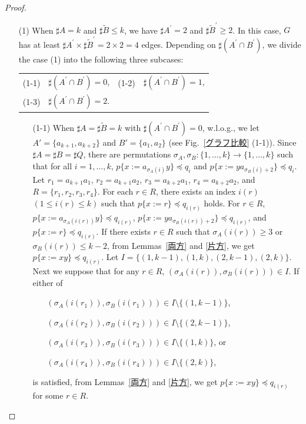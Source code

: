 \begin{proof}
\begin{enumerate}
\item[\textrm{(1)}] 
When $\sharp A=k$ and $\sharp \tilde{B} \le k$, we have $\sharp A^{\prime}=2$ and $\sharp \tilde{B}^{\prime} \ge 2$.
In this case, $G$ has at least $\sharp A^{\prime} \times \sharp \tilde{B}^{\prime}=2\times2=4$ edges.
Depending on $\sharp( A^{\prime} \cap B^{\prime} )$, we divide the case \textrm{(1)} into the following three subcases:
\smallskip

\begin{tabular}{llll}
\textrm{(1-1)} & $\sharp( A^{\prime} \cap B^{\prime} ) = 0$,&
\textrm{(1-2)} & $\sharp( A^{\prime} \cap B^{\prime} ) = 1$,\\
\textrm{(1-3)} & $\sharp( A^{\prime} \cap B^{\prime} ) = 2$.
\end{tabular}

\begin{enumerate}
\item[\textrm(1-1)]
When $\sharp A = \sharp \tilde{B} = k$ with $\sharp( A^{\prime} \cap B^{\prime} ) = 0$, w.l.o.g., we let $A'=\{a_{k+1},a_{k+2}\}$ and $B'=\{a_{1},a_{2}\}$ (see Fig.~\ref{グラフ比較} (1-1)).
Since $\sharp A = \sharp B = \sharp Q$, there are permutations $\sigma_{A},\sigma_{B} : \{1,\dots,k\} \rightarrow \{1,\dots,k\}$ such that for all $i = 1,\ldots,k$, $p \{ x:=a_{\sigma_{A}(i)}y \} \preceq q_{i}$ and $p \{ x:=ya_{\sigma_{B}(i) + 2} \} \preceq q_{i}$.
Let $r_{1}=a_{k+1}a_{1}$, $r_{2}=a_{k+1}a_{2}$, $r_{3}=a_{k+2}a_{1}$, $r_{4}=a_{k+2}a_{2}$, and $R=\{r_{1}, r_{2}, r_{3}, r_{4}\}$.
For each $r \in R$, there exists an index $i(r)$ $(1\le i(r)\le k)$ such that $p \{x := r\} \preceq q_{i(r)}$ holds.
For $r\in R$, $p \{ x:=a_{\sigma_{A}(i(r))}y \} \preceq q_{i(r)}$, $p \{ x:=ya_{\sigma_{B}(i(r))+2} \} \preceq q_{i(r)}$, and $p \{ x:=r \} \preceq q_{i(r)}$.
If there exists $r\in R$ such that $\sigma_{A}(i(r)) \ge 3$ or $\sigma_{B}(i(r)) \le k - 2$, from Lemmas~\ref{両方} and \ref{片方}, we get $p \{x := xy\} \preceq q_{i(r)}$.
%
Let $I = \{(1, k - 1), (1, k), (2, k - 1), (2, k)\}$.
Next we suppose that for any $r\in R$, $(\sigma_{A}(i(r)), \sigma_{B}(i(r))) \in I$.
If either of
\begin{enumerate}
\item[] $(\sigma_{A}(i(r_{1})), \sigma_{B}(i(r_{1}))) \in I\setminus\{(1, k - 1)\}$,
\item[] $(\sigma_{A}(i(r_{2})), \sigma_{B}(i(r_{2}))) \in I\setminus\{(2, k - 1)\}$,
\item[] $(\sigma_{A}(i(r_{3})), \sigma_{B}(i(r_{3}))) \in I\setminus\{(1, k)\}$, or
\item[] $(\sigma_{A}(i(r_{4})), \sigma_{B}(i(r_{4}))) \in I\setminus\{(2, k)\}$,
\end{enumerate}
is satisfied, from Lemmas~\ref{両方} and \ref{片方}, we get $p \{x := xy\} \preceq q_{i(r)}$ for some $r\in R$.


\end{enumerate}
\end{enumerate}
\end{proof}
